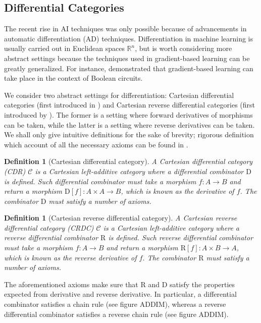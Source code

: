 \documentclass[11pt,a4paper,openright,twoside]{report}
\theoremstyle{plain}
\newtheorem{definition}[proposition]{Definition}
\theoremstyle{definition}
\begin{document}
\subsection{Differential Categories}

The recent rise in AI techniques was only possible because of advancements in automatic differentiation (AD) techniques. Differentiation in machine learning is usually carried out in Euclidean spaces $\mathbb{R}^n$, but is worth considering more abstract settings because the techniques used in gradient-based learning can be greatly generalized. For instance, \cite{wilsonReverseDerivativeAscent2021a} demonstrated that gradient-based learning can take place in the context of Boolean circuits.


We consider two abstract settings for differentiation: Cartesian differential categories (first introduced in \cite{bluteDifferentialCategories2006}) and Cartesian reverse differential categories (first introduced by \cite{cockettReverseDerivativeCategories2019}). The former is a setting where forward derivatives of morphisms can be taken, while the latter is a setting where reverse derivatives can be taken. We shall only give intuitive definitions for the sake of brevity; rigorous definition which account of all the necessary axioms can be found in \cite{cockettReverseDerivativeCategories2019}.

\begin{definition}[Cartesian differential category]
  A Cartesian differential category (CDR) $\mathcal{C}$ is a Cartesian left-additive category where a differential combinator $\mathrm{D}$ is defined. Such differential combinator must take a morphism $f: A \to B$ and return a morphism $\mathrm{D}[f]: A \times A \to B$, which is known as the derivative of $f$. The combinator $\mathrm{D}$ must satisfy a number of axioms. 
\end{definition}

\begin{definition}[Cartesian reverse differential category]
  A Cartesian reverse differential category (CRDC) $\mathcal{C}$ is a Cartesian left-additive category where a reverse differential combinator $\mathrm{R}$ is defined. Such reverse differential combinator must take a morphism $f: A \to B$ and return a morphism $\mathrm{R}[f]: A \times B \to A$, which is known as the reverse derivative of $f$. The combinator $\mathrm{R}$ must satisfy a number of axioms. 
\end{definition}


The aforementioned axioms make sure that $\mathrm{R}$ and $\mathrm{D}$ satisfy the properties expected from derivative and reverse derivative. In particular, a differential combinator satisfies a chain rule (see figure ADDIM), whereas a reverse differential combinator satisfies a reverse chain rule (see figure ADDIM).
\end{document}

